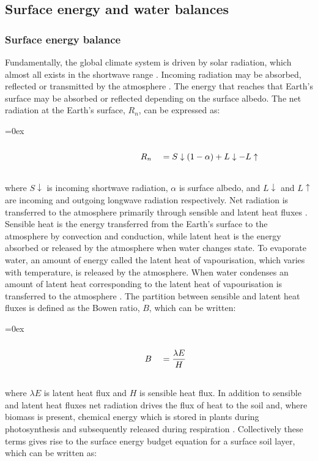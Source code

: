 \documentclass{icldt}\usepackage[]{graphicx}\usepackage[]{color}
\def\leftalgn{0.45}\def\rightalgn{0.45}
\def\algnrow{\rule{\leftalgn\textwidth}{0ex}&\rule{\rightalgn\textwidth}{0ex}}
\newenvironment{algneqn}{%
  \arraycolsep=0ex\renewcommand\arraystretch{0}%
  \begin{equation}%
  \begin{array}{rl}%
  \algnrow\\}%
 {\\\algnrow%
  \end{array}%
  \end{equation}\ignorespacesafterend%
}
\begin{document}
\subsection{Surface energy and water balances}

\subsubsection{Surface energy balance}

Fundamentally, the global climate system is driven by solar radiation, which almost all exists in the shortwave range \citep{Barry2010}. Incoming radiation may be absorbed, reflected or transmitted by the atmosphere \citep{Pitman2003,Seneviratne2010,Barry2010}. The energy that reaches that Earth's surface may be absorbed or reflected depending on the surface albedo. The net radiation at the Earth's surface, $ R_{n} $, can be expressed as:

\begin{algneqn} \label{eq:netradiation}
R_{n}\ &= S \downarrow (1 - \alpha) + L \downarrow - L \uparrow
\end{algneqn}

\noindent where $ S \downarrow $ is incoming shortwave radiation, $ \alpha $ is surface albedo, and $ L \downarrow $ and $ L \uparrow $ are incoming and outgoing longwave radiation respectively. Net radiation is transferred to the atmosphere primarily through sensible and latent heat fluxes \citep{Pitman2003}. Sensible heat is the energy transferred from the Earth's surface to the atmosphere by convection and conduction, while latent heat is the energy absorbed or released by the atmosphere when water changes state. To evaporate water, an amount of energy called the latent heat of vapourisation, which varies with temperature, is released by the atmosphere. When water condenses an amount of latent heat corresponding to the latent heat of vapourisation is transferred to the atmosphere \citep{Barry2010}. The partition between sensible and latent heat fluxes is defined as the Bowen ratio, $ B $, which can be written:

\begin{algneqn}
B\ &= \dfrac{\lambda E}{H}
\end{algneqn}

\noindent where $ \lambda E $ is latent heat flux and $ H $ is sensible heat flux. In addition to sensible and latent heat fluxes net radiation drives the flux of heat to the soil and, where biomass is present, chemical energy which is stored in plants during photosynthesis and subsequently released during respiration \citep{Barry2010}. Collectively these terms gives rise to the surface energy budget equation for a surface soil layer, which can be written as:
\end{document}

